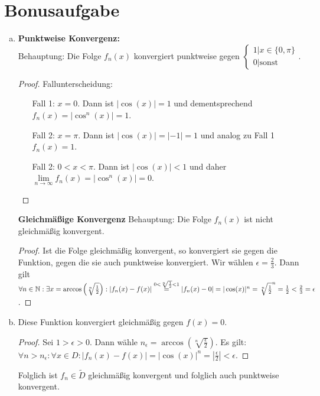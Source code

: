 \documentclass{article}
\begin{document}
    \section*{Bonusaufgabe}
    \begin{enumerate}[(a)]
        \item \textbf{Punktweise Konvergenz:}\\
            Behauptung: Die Folge $f_n(x)$ konvergiert punktweise gegen $\begin{cases}
                1 | x \in \{0, \pi\}\\
                0 | \text{sonst}
            \end{cases}$.
            \begin{proof}
                Fallunterscheidung:
                \begin{itemize}
                    \item[Fall 1:] $x = 0$. Dann ist $|\cos(x)| = 1$ und dementsprechend $f_n(x) = |\cos^n(x)| = 1$.
                    \item[Fall 2:] $x = \pi$. Dann ist $|\cos(x)| = |-1| = 1$ und analog zu Fall 1 $f_n(x) = 1$.
                    \item[Fall 2:] $0 < x < \pi$. Dann ist $|\cos(x)| < 1$ und daher $\lim\limits_{n\to\infty} f_n(x) = |\cos^n(x)| = 0$.
                \end{itemize}
            \end{proof}
            \textbf{Gleichmäßige Konvergenz}
            Behauptung: Die Folge $f_n(x)$ ist nicht gleichmäßig konvergent.
            \begin{proof}
                Ist die Folge gleichmäßig konvergent, so konvergiert sie gegen die Funktion, gegen die sie auch punktweise konvergiert. Wir wählen $\epsilon = \frac{2}{3}$. Dann gilt $\forall n \in \mathbb{N}: \exists x = \arccos\left(\sqrt[n]{\frac{1}{2}}\right): |f_n(x) - f(x)| \overset{0 < \sqrt[n]{\frac{1}{2}} < 1}{=} |f_n(x) - 0| = |\cos(x)|^n = \sqrt[n]{\frac{1}{2}}^n = \frac{1}{2} < \frac{2}{3} = \epsilon$.
            \end{proof}
        \item Diese Funktion konvergiert gleichmäßig gegen $f(x) = 0$.
            \begin{proof}
                Sei $1 > \epsilon > 0$. Dann wähle $n_\epsilon = \arccos(\sqrt[n]{\frac{\epsilon}{2}})$. Es gilt: $\forall n > n_\epsilon: \forall x \in D: |f_n(x) - f(x)| = |\cos(x)|^n = |\frac{\epsilon}{2}| < \epsilon$. 
            \end{proof}
            Folglich ist $f_n \in \tilde{D}$ gleichmäßig konvergent und folglich auch punktweise konvergent. 
    \end{enumerate}
\end{document}
